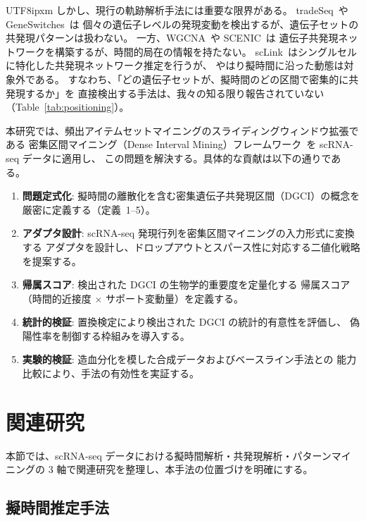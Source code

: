 \documentclass[11pt,a4paper]{article}
\begin{document}
\begin{CJK}{UTF8}{ipxm}
しかし、現行の軌跡解析手法には重要な限界がある。
tradeSeq~\cite{vandenberge2020tradeseq}や GeneSwitches~\cite{cao2020geneswitches}は
個々の遺伝子レベルの発現変動を検出するが、遺伝子セットの共発現パターンは扱わない。
一方、WGCNA~\cite{langfelder2008wgcna}や SCENIC~\cite{aibar2017scenic}は
遺伝子共発現ネットワークを構築するが、時間的局在の情報を持たない。
scLink~\cite{li2021sclink}はシングルセルに特化した共発現ネットワーク推定を行うが、
やはり擬時間に沿った動態は対象外である。
すなわち、「どの遺伝子セットが、擬時間のどの区間で密集的に共発現するか」を
直接検出する手法は、我々の知る限り報告されていない（Table~\ref{tab:positioning}）。

本研究では、頻出アイテムセットマイニングのスライディングウィンドウ拡張である
密集区間マイニング（Dense Interval Mining）フレームワーク~\cite{lancaster2018dense}を scRNA-seq データに適用し、
この問題を解決する。具体的な貢献は以下の通りである。

\begin{enumerate}
  \item \textbf{問題定式化}: 擬時間の離散化を含む密集遺伝子共発現区間（DGCI）の概念を
        厳密に定義する（定義~1--5）。
  \item \textbf{アダプタ設計}: scRNA-seq 発現行列を密集区間マイニングの入力形式に変換する
        アダプタを設計し、ドロップアウトとスパース性に対応する二値化戦略を提案する。
  \item \textbf{帰属スコア}: 検出された DGCI の生物学的重要度を定量化する
        帰属スコア（時間的近接度 $\times$ サポート変動量）を定義する。
  \item \textbf{統計的検証}: 置換検定により検出された DGCI の統計的有意性を評価し、
        偽陽性率を制御する枠組みを導入する。
  \item \textbf{実験的検証}: 造血分化を模した合成データおよびベースライン手法との
        能力比較により、手法の有効性を実証する。
\end{enumerate}

\section{関連研究}
\label{sec:related}

本節では、scRNA-seq データにおける擬時間解析・共発現解析・パターンマイニングの
3 軸で関連研究を整理し、本手法の位置づけを明確にする。

\subsection{擬時間推定手法}


\end{CJK}
\end{document}
